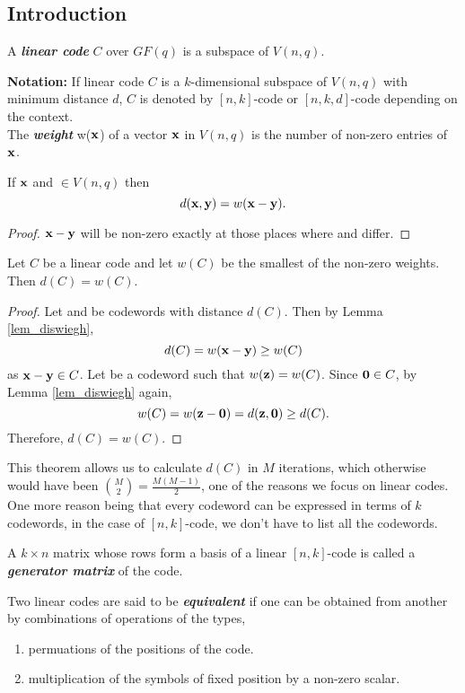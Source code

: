\documentclass[../main.tex]{subfiles}
\begin{document}
\subsection{Introduction}		
\begin{defn}
	A \textbf{\emph{linear code}} $C$ over $GF(q)$ is a subspace of $V(n,q)$. 
\end{defn}		
\textbf{Notation:} If linear code $C$ is a $k$-dimensional subspace of $V(n,q)$ with minimum distance $d$, $C$ is denoted by $[n,k]$-code or $[n,k,d]$-code depending on the context.\\

The \textbf{\emph{weight}} w($\textbf{x}$) of a vector $\textbf{x}$ in $V(n,q)$ is the number of non-zero entries of $\textbf{x}$.
\begin{lem}\label{lem_diswiegh}
	If $\textbf{x}$ and  $\in V(n,q)$ then 
	\[
		d(\textbf{x},\textbf{y})=w(\textbf{x}-\textbf{y}).
	\]
\end{lem}
\begin{proof}
	$\textbf{x}-\textbf{y}$ will be non-zero exactly at those places where  and   differ.
\end{proof}
\begin{thm}\label{thm_minwt_is_mindist}
	Let $C$ be a linear code and let $w(C)$ be the smallest of the non-zero weights. Then $d(C)=w(C).$ 
\end{thm} 
\begin{proof}
	Let  and  be codewords with distance $d(C)$. Then by Lemma \ref{lem_diswiegh},
	\[
		d(C)=w(\textbf{x}-\textbf{y}) \geq w(C)
	\]
	as $\textbf{x}-\textbf{y}\in C$. Let  be a codeword such that $w(\textbf{z})=w(C)$. Since $\textbf{0}\in C$, by Lemma \ref{lem_diswiegh} again,
	\[
		w(C)=w(\textbf{z}-\textbf{0})=d(\textbf{z},\textbf{0})\geq d(C).
	\]
	Therefore, $d(C)=w(C)$.
\end{proof}
This theorem allows us to calculate $d(C)$ in $M$ iterations, which otherwise would have been $\binom{M}{2}=\frac{M(M-1)}{2}$, one of the reasons we focus on linear codes. One more reason being that every codeword can be expressed in terms of $k$ codewords, in the case of $[n,k]$-code, we don't have to list all the codewords.  	

\begin{defn}
	A $k\times n$ matrix whose rows form a basis of a linear $[n,k]$-code is called a \textbf{\emph{generator matrix}} of the code.
\end{defn}
\begin{defn}
	Two linear codes are said to be \textbf{\emph{equivalent}} if one can be obtained from another by combinations of operations of the types,\;
	\begin{enumerate}[label=(\roman*)]
	\itemsep-1mm
		\item permuations of the positions of the code.
		\item multiplication of the symbols of fixed position by a non-zero scalar.
	\end{enumerate}
\end{defn}
\end{document}

